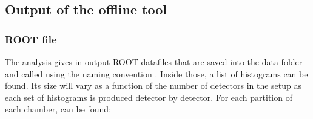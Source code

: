	\subsection{Output of the offline tool}
	\label{app2:ssec:output}
	
		\subsubsection{ROOT file}
		\label{app2:sssec:ROOT}
	
	The analysis gives in output ROOT datafiles that are saved into the data folder and called using the naming convention . Inside those, a list of  histograms can be found. Its size will vary as a function of the number of detectors in the setup as each set of histograms is produced detector by detector. For each partition of each chamber, can be found:

